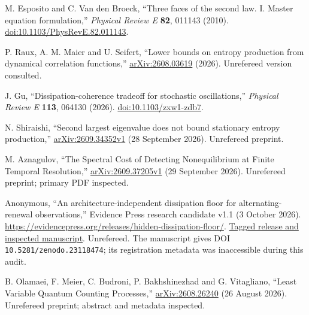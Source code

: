 M. Esposito and C. Van den Broeck,
``Three faces of the second law. I. Master equation formulation,''
\emph{Physical Review E} \textbf{82}, 011143 (2010).
\href{https://doi.org/10.1103/PhysRevE.82.011143}{doi:10.1103/PhysRevE.82.011143}.

P. Raux, A. M. Maier and U. Seifert,
``Lower bounds on entropy production from dynamical correlation functions,''
\href{https://arxiv.org/abs/2608.03619}{arXiv:2608.03619} (2026).
Unrefereed version consulted.

J. Gu, ``Dissipation-coherence tradeoff for stochastic oscillations,''
\emph{Physical Review E} \textbf{113}, 064130 (2026).
\href{https://doi.org/10.1103/zxw1-zdb7}{doi:10.1103/zxw1-zdb7}.

N. Shiraishi, ``Second largest eigenvalue does not bound stationary entropy production,''
\href{https://arxiv.org/abs/2609.34352}{arXiv:2609.34352v1} (28 September 2026).
Unrefereed preprint.

M. Aznagulov,
``The Spectral Cost of Detecting Nonequilibrium at Finite Temporal Resolution,''
\href{https://arxiv.org/abs/2609.37205}{arXiv:2609.37205v1} (29 September 2026).
Unrefereed preprint; primary PDF inspected.

Anonymous, ``An architecture-independent dissipation floor for alternating-renewal observations,''
Evidence Press research candidate v1.1 (3 October 2026).
\url{https://evidencepress.org/releases/hidden-dissipation-floor/}.
\href{https://github.com/ipitchford/hidden-dissipation-floor/releases/tag/v1.1.0-candidate}{Tagged release and inspected manuscript}.
Unrefereed. The manuscript gives DOI \texttt{10.5281/zenodo.23118474};
its registration metadata was inaccessible during this audit.

B. Olamaei, F. Meier, C. Budroni, P. Bakhshinezhad and G. Vitagliano,
``Least Variable Quantum Counting Processes,''
\href{https://arxiv.org/abs/2608.26240}{arXiv:2608.26240} (26 August 2026).
Unrefereed preprint; abstract and metadata inspected.
